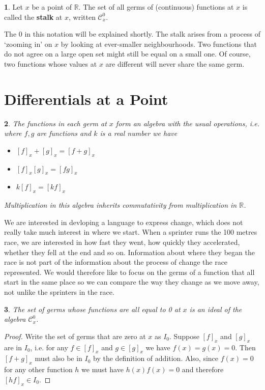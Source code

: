 \documentclass[oneside,english]{amsbook}
\numberwithin{section}{chapter}
\theoremstyle{plain}
\newtheorem{thm}{\protect\theoremname}
\theoremstyle{definition}
\newtheorem{defn}[thm]{\protect\definitionname}
\providecommand{\definitionname}{Definition}
\providecommand{\theoremname}{Theorem}
\begin{document}
			\begin{defn}
				Let $x$ be a point of $\mathbb{R}$. The set of all germs of (continuous) functions at $x$ is called the \textbf{stalk} at $x$, written $\mathscr{C}^0_x$.
			\end{defn}
			
			The 0 in this notation will be explained shortly. The stalk arises from a process of `zooming in' on $x$ by looking at ever-smaller neighbourhoods. Two functions that do not agree on a large open set might still be equal on a small one. Of course, two functions whose values at $x$ are different will never share the same germ. 
			
		\section{Differentials at a Point}
		
			\begin{thm}
				The functions in each germ at $x$ form an algebra with the usual operations, i.e. where $f, g$ are functions and $k$ is a real number we have
				\begin{itemize}
					\item{$[f]_x + [g]_x = [f + g]_x$}
					\item{$[f]_x [g]_x = [fg]_x$}
					\item{$k[f]_x = [kf]_x$}
				\end{itemize}
				Multiplication in this algebra inherits commutativity from multiplication in $\mathbb{R}$.
			\end{thm}
			
			We are interested in devloping a language to express change, which does not really take much interest in where we start. When a sprinter runs the 100 metres race, we are interested in how fast they went, how quickly they accelerated, whether they fell at the end and so on. Information about where they began the race is not part of the information about the process of change the race represented. We would therefore like to focus on the germs of a function that all start in the same place so we can compare the way they change as we move away, not unlike the sprinters in the race.
			
			\begin{thm}
				The set of germs whose functions are all equal to 0 at $x$ is an ideal of the algebra $\mathscr{C}^0_x$.
			\end{thm}
			
			\begin{proof}
				Write the set of germs that are zero at $x$ as $I_0$. Suppose $[f]_x$ and $[g]_x$ are in $I_0$, i.e. for any $f\in [f]_x$ and $g\in [g]_x$ we have $f(x) = g(x) = 0$. Then $[f + g]_x$ must also be in $I_0$ by the definition of addition. Also, since $f(x)=0$ for any other function $h$ we must have $h(x)f(x) = 0$ and therefore $[hf]_x\in I_0$. 
			\end{proof}
			
\end{document}
